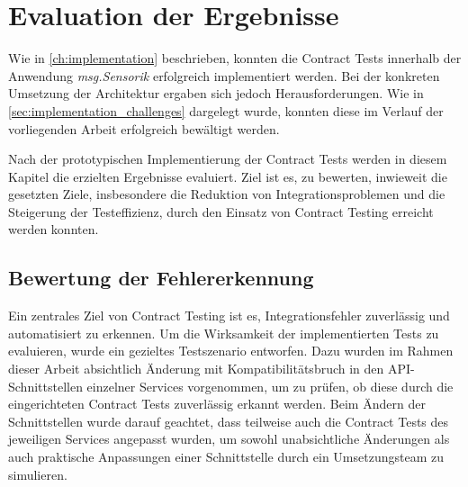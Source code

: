 \chapter{Evaluation der Ergebnisse}\label{ch:evaluation}

Wie in \cref{ch:implementation} beschrieben, konnten die Contract Tests innerhalb der Anwendung \linebreak\textit{msg.Sensorik} erfolgreich implementiert werden.
Bei der konkreten Umsetzung der Architektur ergaben sich jedoch Herausforderungen.
Wie in \cref{sec:implementation_challenges} dargelegt wurde, konnten diese im Verlauf der vorliegenden Arbeit erfolgreich bewältigt werden.

Nach der prototypischen Implementierung der Contract Tests werden in diesem Kapitel die erzielten Ergebnisse evaluiert.
Ziel ist es, zu bewerten, inwieweit die gesetzten Ziele, insbesondere die Reduktion von Integrationsproblemen und die Steigerung der Testeffizienz, durch den Einsatz von Contract Testing erreicht werden konnten.

\section{Bewertung der Fehlererkennung}\label{sec:evaluation_errordetection}

Ein zentrales Ziel von Contract Testing ist es, Integrationsfehler zuverlässig und automatisiert zu erkennen.
Um die Wirksamkeit der implementierten Tests zu evaluieren, wurde ein gezieltes Testszenario entworfen.
Dazu wurden im Rahmen dieser Arbeit absichtlich Änderung mit Kompatibilitätsbruch in den \gls{API}-Schnittstellen einzelner Services vorgenommen, um zu prüfen, ob diese durch die eingerichteten Contract Tests zuverlässig erkannt werden.
Beim Ändern der Schnittstellen wurde darauf geachtet, dass teilweise auch die Contract Tests des jeweiligen Services angepasst wurden, um sowohl unabsichtliche Änderungen als auch praktische Anpassungen einer Schnittstelle durch ein Umsetzungsteam zu simulieren.

